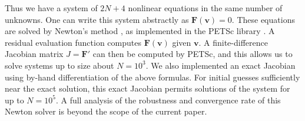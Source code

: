 \documentclass[twocolumn]{igs}
\begin{document}
Thus we have a system of $2N+4$ nonlinear equations in the same number of unknowns.  One can write this system abstractly as $\mathbf{F}(\mathbf{v})=0$.  These equations are solved by Newton's method \citep{Kelley}, as implemented in the PETSc library \citep{petsc-user-ref}.  A residual evaluation function computes $\mathbf{F}(\mathbf{v})$ given $\mathbf{v}$.  A finite-difference Jacobian matrix $J=\mathbf{F}'$ can then be computed by PETSc, and this allows us to solve systems up to size about $N=10^3$.  We also implemented an exact Jacobian using by-hand differentiation of the above formulas.  For initial guesses sufficiently near the exact solution, this exact Jacobian permits solutions of the system for up to $N=10^5$.  A full analysis of the robustness and convergence rate of this Newton solver is beyond the scope of the current paper.
\end{document}
